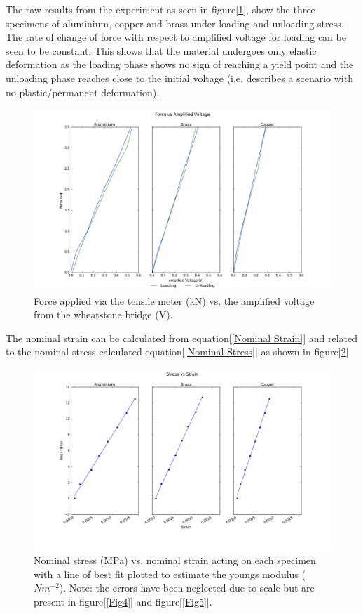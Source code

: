 \documentclass[a4paper,10pt]{article}
\begin{document}
The raw results from the experiment as seen in figure[\ref{Fig1}], show the three specimens of aluminium, copper and brass under loading and unloading stress. The rate of change of force with respect to amplified voltage for loading can be seen to be constant. This shows that the material undergoes only elastic deformation as the loading phase shows no sign of reaching a yield point and the unloading phase reaches close to the initial voltage (i.e. describes a scenario with no plastic/permanent deformation). 
\begin{figure}[htb]
\centering
\includegraphics[width=\textwidth]{figure_3.png}
\caption{Force applied via the tensile meter (kN) vs. the amplified voltage from the wheatstone bridge (V).}
\label{Fig1}
\end{figure}

The nominal strain can be calculated from equation[\ref{Nominal Strain}] and related to the nominal stress calculated equation[\ref{Nominal Stress}] as shown in figure[\ref{Fig2}] 

\begin{figure}[htb]
\centering
\includegraphics[width=\textwidth]{figure_4.png}
\caption{Nominal stress (MPa) vs.  nominal strain acting on each specimen with a line of best fit plotted to estimate the youngs modulus ($Nm^{-2}$). Note: the errors have been neglected due to scale but are present in figure[\ref{Fig4}] and figure[\ref{Fig5}].}
\label{Fig2}
\end{figure}
\end{document}
